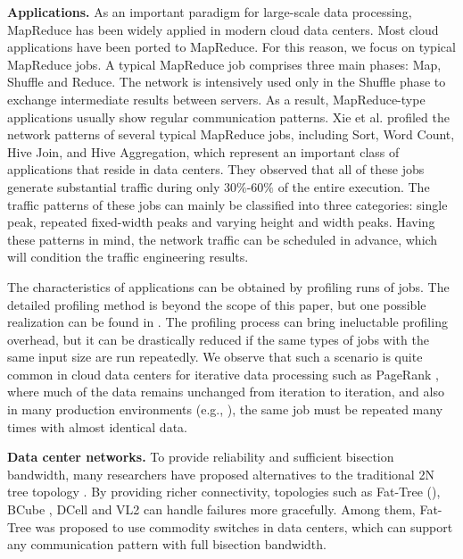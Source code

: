 \documentclass[journal,single-space,two column,twoside,10pt]{IEEEtran}
\begin{document}
\textbf{Applications.} As an important paradigm for large-scale data processing, MapReduce \cite{Dean_Chemawat-2008} has been widely applied in modern cloud data centers.
Most cloud applications have been ported to MapReduce. For this reason, we focus on typical MapReduce jobs. A typical MapReduce job comprises three main phases: Map, Shuffle and Reduce. The network is intensively used only in the Shuffle phase to exchange intermediate results between servers. As a result, MapReduce-type applications usually show regular communication patterns. Xie et al. \cite{Xie_Ding-2012} profiled the network patterns of several typical MapReduce jobs, including Sort, Word Count, Hive Join, and Hive Aggregation, which represent an important class of applications that reside in data centers. They observed that all of these jobs generate substantial traffic during only $30\%$-$60\%$ of the entire execution. The traffic patterns of these jobs can mainly be classified into three categories: single peak, repeated fixed-width peaks and varying height and width peaks. Having these patterns in mind, the network traffic can be scheduled in advance, which will condition the traffic engineering results.

The characteristics of applications can be obtained by profiling runs of jobs. The detailed profiling method is beyond the scope of this paper, but one possible realization can be found in \cite{Xie_Ding-2012}. The profiling process can bring ineluctable profiling overhead, but it can be drastically reduced if the same types of jobs with the same input size are run repeatedly. We observe that such a scenario is quite common in cloud data centers for iterative data processing such as PageRank \cite{Page_Brin-1999}, where much of the data remains unchanged from iteration to iteration, and also in many production environments (e.g., \cite{Agarwal_Kandula-2012}), the same job must be repeated many times with almost identical data.

\textbf{Data center networks.} To provide reliability and sufficient bisection bandwidth, many researchers have proposed alternatives to the traditional 2N tree topology \cite{Cisco}. By providing richer connectivity, topologies such as Fat-Tree (\cite{Al-Fares_Loukissas-2008, Niranjan_Pamboris-2009}), BCube \cite{Guo_Lu-2009}, DCell \cite{Guo_Wu-2008} and VL2 \cite{Greenberg_Hamilton-2009} can handle failures more gracefully. Among them, Fat-Tree was proposed to use commodity switches in data centers, which can support any communication pattern with full bisection bandwidth.
\end{document}
